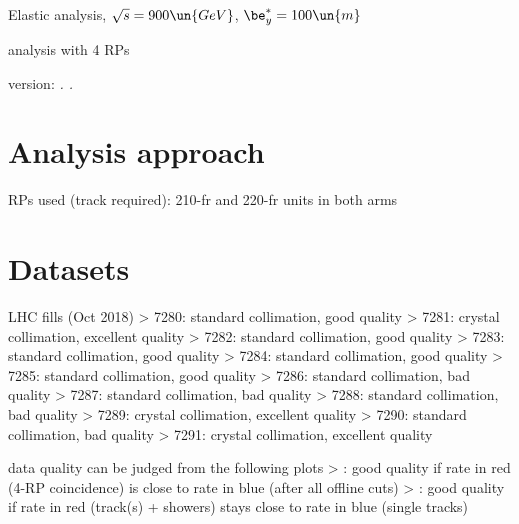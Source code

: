 

\def\baseDir{/afs/cern.ch/work/j/jkaspar/work/analyses/elastic/450GeV/beta100/4rp/}


\hbox{}
\vskip-10mm

\centerline{\SetFontSizesXX Elastic analysis, $\sqrt s = 900\un{GeV}$, $\be^*_y = 100\un{m}$}
\vskip2mm
\centerline{\SetFontSizesXX analysis with 4 RPs }
\vskip2mm
\centerline{version: {\it \number\day. \number\month. \number\year}}

\vfil
\InsertToc

\vfil
\eject

\BeginText

\chapter{Analysis approach}

\> RPs used (track required): 210-fr and 220-fr units in both arms



\chapter[datasets]{Datasets}

\> LHC fills (Oct 2018)
\>> 7280: standard collimation, good quality
\>> 7281: crystal collimation, excellent quality
\>> 7282: standard collimation, good quality
\>> 7283: standard collimation, good quality
\>> 7284: standard collimation, good quality
\>> 7285: standard collimation, good quality
\>> 7286: standard collimation, bad quality
\>> 7287: standard collimation, bad quality
\>> 7288: standard collimation, bad quality
\>> 7289: crystal collimation, excellent quality
\>> 7290: standard collimation, bad quality
\>> 7291: crystal collimation, excellent quality

\> data quality can be judged from the following plots
\>> : good quality if rate in red (4-RP coincidence) is close to rate in blue (after all offline cuts)
\>> : good quality if rate in red (track(s) + showers) stays close to rate in blue (single tracks)

